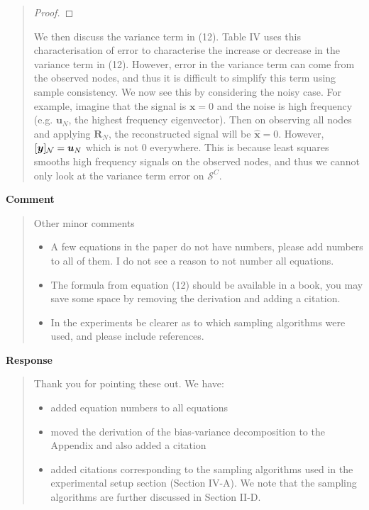 \documentclass[11pt,onecolumn,journal]{IEEEtran}
\newcommand{\matr}[1]{\bm{#1}}
\newcommand{\vect}[1]{\bm{#1}}
\theoremstyle{definition}
\newcommand{\set}[1]{\mathcal{#1}}
\begin{document}
\begin{quote}
\begin{proof}
\end{proof}

We then discuss the variance term in (12). 
Table IV uses this characterisation of error to characterise the increase or decrease in the variance term in (12). However, error in the variance term can come from the observed nodes, and thus it is difficult to simplify this term using sample consistency. We now see this by considering the noisy case. For example, imagine that the signal is $\vect{x} = 0$ and the noise is high frequency (e.g. $\vect{u}_{N}$, the highest frequency eigenvector). Then on observing all nodes and applying $\matr{R}_{N}$, the reconstructed signal will be $\hat{\vect{x}} = 0$. However, $\vectsub[N]{y} = \vect{u}_{N}$ which is not 0 everywhere. This is because least squares smooths high frequency signals on the observed nodes, and thus we cannot only look at the variance term error on $\set{S}^{C}$.
\end{quote}

\textbf{Comment}
\begin{quote}
Other minor comments
\begin{itemize}
\item A few equations in the paper do not have numbers, please add numbers to all of them.  I do not see a reason to not number all equations.
\item The formula from equation (12) should be available in a book, you may save some space by removing the derivation and adding a citation.
\item In the experiments be clearer as to which sampling algorithms were used, and please include references.
\end{itemize}
\end{quote}

\textbf{Response}
\begin{quote}
Thank you for pointing these out. We have:
\begin{itemize}
    \item added equation numbers to all equations
    \item moved the derivation of the bias-variance decomposition to the Appendix and also added a citation
    \item added citations corresponding to the sampling algorithms used in the experimental setup section (Section IV-A). We note that the sampling algorithms are further discussed in Section II-D.
\end{itemize}
\end{quote}
\end{document}
